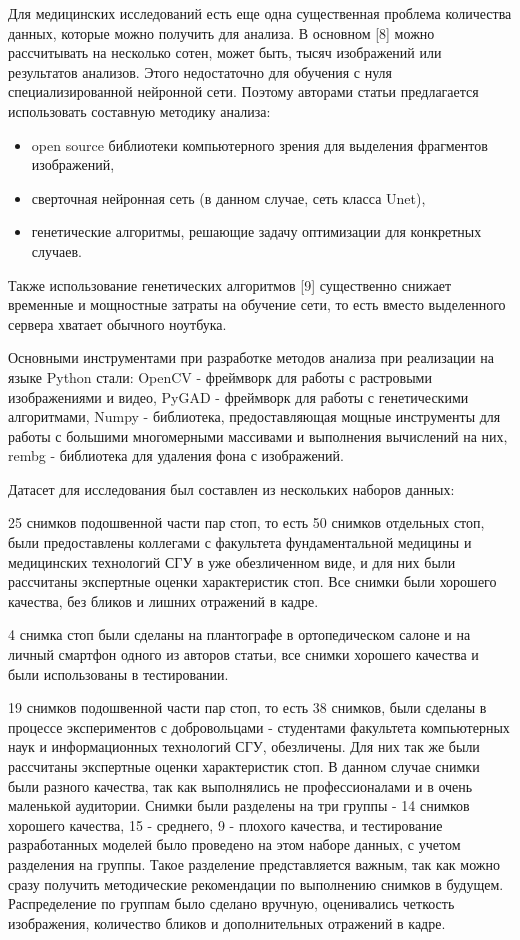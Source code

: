 \documentclass[coursework]{SCWorks}
\begin{document}
Для медицинских исследований есть еще одна существенная проблема количества данных, которые можно получить для анализа. В основном [8] можно рассчитывать на несколько сотен, может быть, тысяч изображений или результатов анализов. Этого недостаточно для обучения с нуля специализированной нейронной сети. Поэтому авторами статьи предлагается использовать составную методику анализа:
\begin{itemize}
    \item open source библиотеки компьютерного зрения для выделения фрагментов изображений,
    \item сверточная нейронная сеть (в данном случае, сеть класса Unet),
    \item генетические алгоритмы, решающие задачу оптимизации для конкретных случаев.
\end{itemize}

Также использование генетических алгоритмов [9] существенно снижает временные и мощностные затраты на обучение сети, то есть вместо выделенного сервера хватает обычного ноутбука.

Основными инструментами при разработке методов анализа при реализации на языке Python стали: OpenCV - фреймворк для работы с растровыми изображениями и видео, PyGAD - фреймворк для работы с генетическими алгоритмами, Numpy - библиотека, предоставляющая мощные инструменты для работы с большими многомерными массивами и выполнения вычислений на них, rembg - библиотека для удаления фона с изображений.

Датасет для исследования был составлен из нескольких наборов данных:

25 снимков подошвенной части пар стоп, то есть 50 снимков отдельных стоп, были предоставлены коллегами с факультета фундаментальной медицины и медицинских технологий СГУ в уже обезличенном виде, и для них были рассчитаны экспертные оценки характеристик стоп. Все снимки были хорошего качества, без бликов и лишних отражений в кадре.

4 снимка стоп были сделаны на плантографе в ортопедическом салоне и на личный смартфон одного из авторов статьи, все снимки хорошего качества и были использованы в тестировании.

19 снимков подошвенной части пар стоп, то есть 38 снимков, были сделаны в процессе экспериментов с добровольцами - студентами факультета компьютерных наук и информационных технологий СГУ, обезличены. Для них так же были рассчитаны экспертные оценки характеристик стоп. В данном случае снимки были разного качества, так как выполнялись не профессионалами и в очень маленькой аудитории. Снимки были разделены на три группы - 14 снимков хорошего качества, 15 - среднего, 9 - плохого качества, и тестирование разработанных моделей было проведено на этом наборе данных, с учетом разделения на группы. Такое разделение представляется важным, так как можно сразу получить методические рекомендации по выполнению снимков в будущем. Распределение по группам было сделано вручную, оценивались четкость изображения, количество бликов и дополнительных отражений в кадре.
\end{document}
